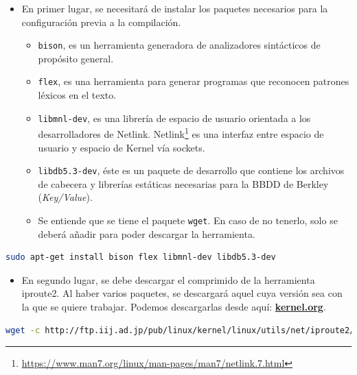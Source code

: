 \begin{itemize}
    \item En primer lugar, se necesitará de instalar los paquetes necesarios para la configuración previa a la compilación.
          \begin{itemize}
              \item \texttt{bison}, es un herramienta generadora de analizadores sintácticos de propósito general.
              \item \texttt{flex}, es una herramienta para generar programas que reconocen patrones léxicos en el texto.
              \item \texttt{libmnl-dev}, es una librería de espacio de usuario orientada a los desarrolladores de Netlink. Netlink\footnote{\url{https://www.man7.org/linux/man-pages/man7/netlink.7.html}} es una interfaz entre espacio de usuario y espacio de Kernel vía sockets.

              \item \texttt{libdb5.3-dev}, éste es un paquete de desarrollo que contiene los archivos de cabecera y librerías estáticas necesarias para la BBDD de Berkley (\textit{Key/Value}).

              \item Se entiende que se tiene el paquete \texttt{wget}. En caso de no tenerlo, solo se deberá añadir para poder descargar la herramienta.
          \end{itemize}
\end{itemize}
\begin{lstlisting}[language= bash, style=Consola2, caption={Instalación de las dependencias de Iproute2},label=code:iproute2_deps]
   sudo apt-get install bison flex libmnl-dev libdb5.3-dev
\end{lstlisting}
\begin{itemize}
    \item En segundo lugar, se debe descargar el comprimido de la herramienta iproute2. Al haber varios paquetes, se descargará aquel cuya versión sea con la que se quiere trabajar. Podemos descargarlas desde aquí: \href{https://mirrors.edge.kernel.org/pub/linux/utils/net/iproute2/}{\textbf{kernel.org}}.
\end{itemize}
\begin{lstlisting}[language= bash, style=Consola, caption={Obtención del source de Iproute2},label=code:iproute2_src]
   wget -c http://ftp.iij.ad.jp/pub/linux/kernel/linux/utils/net/iproute2/iproute2-4.15.0.tar.gz
\end{lstlisting}

